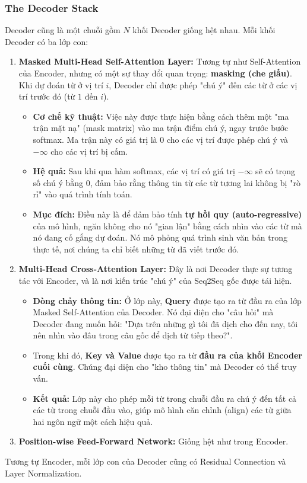 \subsubsection{The Decoder Stack}
Decoder cũng là một chuỗi gồm $N$ khối Decoder giống hệt nhau. Mỗi khối Decoder có ba lớp con:
\begin{enumerate}
    \item \textbf{Masked Multi-Head Self-Attention Layer:} Tương tự như Self-Attention của Encoder, nhưng có một sự thay đổi quan trọng: \textbf{masking (che giấu)}. Khi dự đoán từ ở vị trí $i$, Decoder chỉ được phép "chú ý" đến các từ ở các vị trí trước đó (từ $1$ đến $i$).
    \begin{itemize}
        \item \textbf{Cơ chế kỹ thuật:} Việc này được thực hiện bằng cách thêm một "ma trận mặt nạ" (mask matrix) vào ma trận điểm chú ý, ngay trước bước softmax. Ma trận này có giá trị là 0 cho các vị trí được phép chú ý và $-\infty$ cho các vị trí bị cấm.
        \item \textbf{Hệ quả:} Sau khi qua hàm softmax, các vị trí có giá trị $-\infty$ sẽ có trọng số chú ý bằng 0, đảm bảo rằng thông tin từ các từ tương lai không bị "rò rỉ" vào quá trình tính toán.
        \item \textbf{Mục đích:} Điều này là để đảm bảo tính \textbf{tự hồi quy (auto-regressive)} của mô hình, ngăn không cho nó "gian lận" bằng cách nhìn vào các từ mà nó đang cố gắng dự đoán. Nó mô phỏng quá trình sinh văn bản trong thực tế, nơi chúng ta chỉ biết những từ đã viết trước đó.
    \end{itemize}
    \item \textbf{Multi-Head Cross-Attention Layer:} Đây là nơi Decoder thực sự tương tác với Encoder, và là nơi kiến trúc "chú ý" của Seq2Seq gốc được tái hiện.
    \begin{itemize}
        \item \textbf{Dòng chảy thông tin:} Ở lớp này, \textbf{Query} được tạo ra từ đầu ra của lớp Masked Self-Attention của Decoder. Nó đại diện cho "câu hỏi" mà Decoder đang muốn hỏi: "Dựa trên những gì tôi đã dịch cho đến nay, tôi nên nhìn vào đâu trong câu gốc để dịch từ tiếp theo?".
        \item Trong khi đó, \textbf{Key và Value} được tạo ra từ \textbf{đầu ra của khối Encoder cuối cùng}. Chúng đại diện cho "kho thông tin" mà Decoder có thể truy vấn.
        \item \textbf{Kết quả:} Lớp này cho phép mỗi từ trong chuỗi đầu ra chú ý đến tất cả các từ trong chuỗi đầu vào, giúp mô hình căn chỉnh (align) các từ giữa hai ngôn ngữ một cách hiệu quả.
    \end{itemize}
    \item \textbf{Position-wise Feed-Forward Network:} Giống hệt như trong Encoder.
\end{enumerate}
Tương tự Encoder, mỗi lớp con của Decoder cũng có Residual Connection và Layer Normalization.

